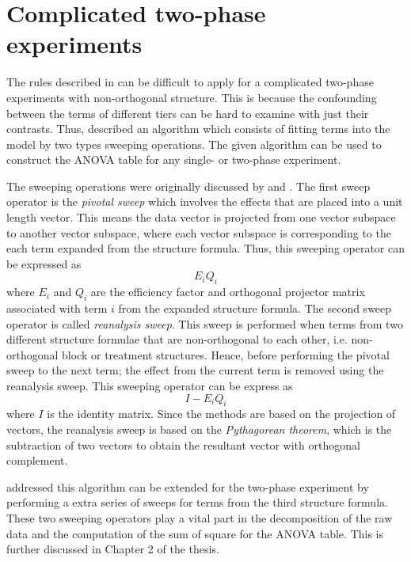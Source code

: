 \documentclass[11pt,a4paper]{article}
\begin{document}
\section{Complicated two-phase experiments}
The rules described in \cite{Brien1983} can be difficult to apply for a complicated two-phase experiments with non-orthogonal structure. This is because the confounding between the terms of different tiers can be hard to examine with just their contrasts. Thus, \cite{Brien1999} described an algorithm which consists of fitting terms into the model by two types sweeping operations.  The given algorithm can be used to construct the ANOVA table for any single- or two-phase experiment. 

The sweeping operations were originally discussed by \cite{Wilkinson1970} and \cite{Payne1977}. The first sweep operator is the \emph{pivotal sweep} which involves the effects that are placed into a unit length vector. This means the data vector is projected from one vector subspace to another vector subspace, where each vector subspace is corresponding to the each term expanded from the structure formula. Thus, this sweeping operator can be expressed as 
\begin{equation}
E_i Q_i
\end{equation}
where $E_i$ and $Q_i$ are the efficiency factor and orthogonal projector matrix associated with term $i$ from the expanded structure formula. The second sweep operator is called \emph{reanalysis sweep}. This sweep is performed when terms from two different structure formulae that are non-orthogonal to each other, i.e. non-orthogonal block or treatment structures. Hence, before performing the pivotal sweep to the next term; the effect from the current term is removed using the reanalysis sweep. This sweeping operator can be express as 
\begin{equation}
I - E_i Q_i
\end{equation}
where $I$ is the identity matrix. Since the methods are based on the projection of vectors, the reanalysis sweep is based on the \emph{Pythagorean theorem}, which is the subtraction of two vectors to obtain the resultant vector with orthogonal complement.

\cite{Brien1999} addressed this algorithm can be extended for the two-phase experiment by performing a extra series of sweeps for terms from the third structure formula. These two sweeping operators play a vital part in the decomposition of the raw data and the computation of the sum of square for the ANOVA table. This is further discussed in Chapter 2 of the thesis.
\end{document}
